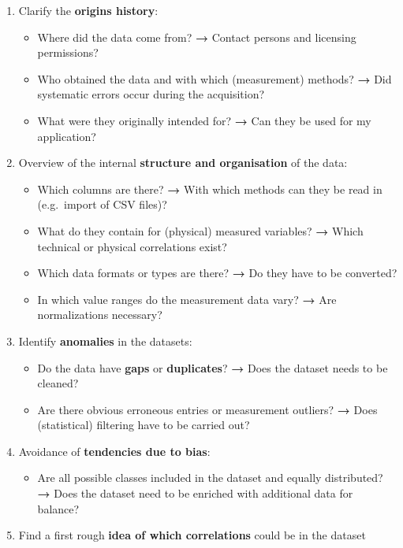 \documentclass [oneside,10pt,a4paper,ngerman,BCOR10mm,headsepline,parindent,final]{scrartcl}
\providecommand{\tightlist}{%
      \setlength{\itemsep}{0pt}\setlength{\parskip}{0pt}}
\begin{document}
\begin{enumerate}
\def\labelenumi{\arabic{enumi}.}
\tightlist
\item
  Clarify the \textbf{origins history}:

  \begin{itemize}
  \tightlist
  \item
    Where did the data come from? \textbf{→} Contact persons and
    licensing permissions?
  \item
    Who obtained the data and with which (measurement) methods?
    \textbf{→} Did systematic errors occur during the acquisition?
  \item
    What were they originally intended for? \textbf{→} Can they be used
    for my application?
  \end{itemize}
\item
  Overview of the internal \textbf{structure and organisation} of the
  data:

  \begin{itemize}
  \tightlist
  \item
    Which columns are there? \textbf{→} With which methods can they be
    read in (e.g.~import of CSV files)?
  \item
    What do they contain for (physical) measured variables? \textbf{→}
    Which technical or physical correlations exist?
  \item
    Which data formats or types are there? \textbf{→} Do they have to be
    converted?
  \item
    In which value ranges do the measurement data vary? \textbf{→} Are
    normalizations necessary?
  \end{itemize}
\item
  Identify \textbf{anomalies} in the datasets:

  \begin{itemize}
  \tightlist
  \item
    Do the data have \textbf{gaps} or \textbf{duplicates}? \textbf{→}
    Does the dataset needs to be cleaned?
  \item
    Are there obvious erroneous entries or measurement outliers?
    \textbf{→} Does (statistical) filtering have to be carried out?
  \end{itemize}
\item
  Avoidance of \textbf{tendencies due to bias}:

  \begin{itemize}
  \tightlist
  \item
    Are all possible classes included in the dataset and equally
    distributed? \textbf{→} Does the dataset need to be enriched with
    additional data for balance?
  \end{itemize}
\item
  Find a first rough \textbf{idea of which correlations} could be in the
  dataset
\end{enumerate}
\end{document}
